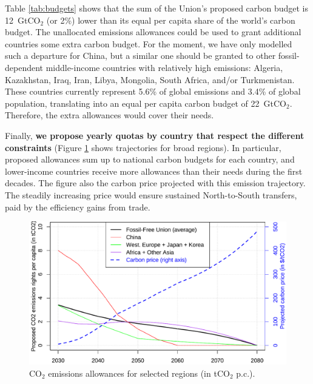 \documentclass[12pt,english]{article}
\begin{document}
Table \ref{tab:budgets} shows that the sum of the Union's proposed carbon budget is 12~GtCO$_\text{2}$ (or 2\%) lower than its equal per capita share of the world's carbon budget. The unallocated emissions allowances could be used to grant additional countries some extra carbon budget. For the moment, we have only modelled such a departure for China, but a similar one should be granted to other fossil-dependent middle-income countries with relatively high emissions: Algeria, Kazakhstan, Iraq, Iran, Libya, Mongolia, South Africa, and/or Turkmenistan. %
These countries currently represent 5.6\% of global emissions and 3.4\% of global population, translating into an equal per capita carbon budget of 22~GtCO$_\text{2}$. Therefore, the extra allowances would cover their needs. 

Finally, \textbf{we propose yearly quotas by country that respect the different constraints} (Figure \ref{fig:trajectories} shows trajectories for broad regions). 
In particular, proposed allowances sum up to national carbon budgets for each country, and lower-income countries receive more allowances than their needs during the first decades. %
The figure also the carbon price projected with this emission trajectory. The steadily increasing price would ensure sustained North-to-South transfers, paid by the efficiency gains from trade.

\begin{figure}[h]
  \centering \caption{CO$_\text{2}$ emissions allowances for selected regions (in tCO$_\text{2}$ p.c.).\label{fig:trajectories}}
  \includegraphics[width=.7\textwidth]{../figures/policies/ffu_rights_pc_price.pdf} 
\end{figure}

\end{document}
